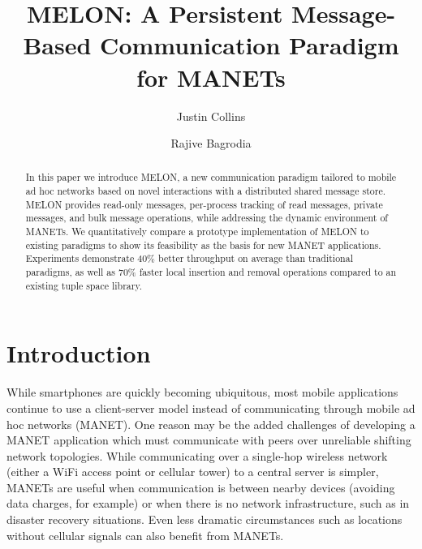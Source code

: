 \documentclass[lnicst]{svmultln}
\begin{document}
\mainmatter  %

\title{MELON: A Persistent Message-Based Communication Paradigm for MANETs}


\author{Justin Collins\and Rajive Bagrodia}




\maketitle
\begin{abstract}
In this paper we introduce MELON, a new communication paradigm tailored to mobile ad hoc networks based on novel interactions with a distributed shared message store. MELON provides read-only messages, per-process tracking of read messages, private messages, and bulk message operations, while addressing the dynamic environment of MANETs. We quantitatively compare a prototype implementation of MELON to existing paradigms to show its feasibility as the basis for new MANET applications. Experiments demonstrate 40\% better throughput on average than traditional paradigms, as well as 70\% faster local insertion and removal operations compared to an existing tuple space library.
\end{abstract}

\section{Introduction}

While smartphones are quickly becoming ubiquitous, most mobile applications continue to use a client-server model instead of communicating through mobile ad hoc networks (MANET). One reason may be the added challenges of developing a MANET application which must communicate with peers over unreliable shifting network topologies. While communicating over a single-hop wireless network (either a WiFi access point or cellular tower) to a central server is simpler, MANETs are useful when communication is between nearby devices (avoiding data charges, for example) or when there is no network infrastructure, such as in disaster recovery situations. Even less dramatic circumstances such as locations without cellular signals can also benefit from MANETs.
\end{document}
